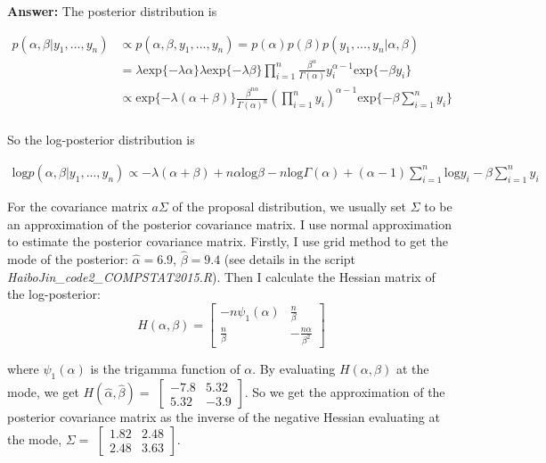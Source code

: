 \documentclass[12pt]{article}
\begin{document}
\vspace{5mm}

\textbf{Answer:} The posterior distribution is

\begin{equation}
\begin{split}
p(\alpha, \beta | y_1,...,y_n) &\propto p(\alpha, \beta, y_1,...,y_n) = p(\alpha)p(\beta)p(y_1,...,y_n|\alpha,\beta) \\
&= \lambda \text{exp}\{-\lambda \alpha\} \lambda \text{exp}\{-\lambda \beta\}\prod_{i=1}^n \frac{\beta^{\alpha}}{\Gamma(\alpha)}y_i^{\alpha-1}\text{exp}\{-\beta y_i\} \\
&\propto \text{exp}\{-\lambda(\alpha+\beta)\}\frac{\beta^{n\alpha}}{\Gamma(\alpha)^n}(\prod_{i=1}^n y_i)^{\alpha-1} \text{exp}\{-\beta \sum_{i=1}^n y_i\} \\
\end{split}
\end{equation}

So the log-posterior distribution is 

\begin{equation}
\begin{split}
\text{log} p(\alpha, \beta | y_1,...,y_n) \propto -\lambda (\alpha+\beta)+n\alpha \text{log}\beta - n\text{log} \Gamma(\alpha) + (\alpha-1)\sum_{i=1}^n \text{log}y_i - \beta \sum_{i=1}^n y_i
\end{split}
\end{equation}

For the covariance matrix $a\Sigma$ of the proposal distribution, we usually set $\Sigma$ to be an approximation of the posterior covariance matrix. I use normal approximation to estimate the posterior covariance matrix. Firstly, I use grid method to get the mode of the posterior: $\hat{\alpha} = 6.9$, $\hat{\beta} = 9.4$ (see details in the script \textit{HaiboJin\_code2\_COMPSTAT2015.R}). Then I calculate the Hessian matrix of the log-posterior: 
\begin{equation*}
H(\alpha, \beta) = 
\begin{bmatrix}
-n\psi_1(\alpha) & \frac{n}{\beta} \\ 
\frac{n}{\beta} & -\frac{n\alpha}{\beta^2}
\end{bmatrix}
\end{equation*}

where $\psi_1(\alpha)$ is the trigamma function of $\alpha$. By evaluating $H(\alpha, \beta)$ at the mode, we get 
$H(\hat{\alpha}, \hat{\beta}) = $
$\begin{bmatrix}
-7.8&5.32 \\ 5.32&-3.9
\end{bmatrix}$. So we get the approximation of the posterior covariance matrix as the inverse of the negative Hessian evaluating at the mode, 
$\Sigma = $
$\begin{bmatrix}
1.82&2.48 \\ 2.48&3.63
\end{bmatrix}$.
\end{document}
